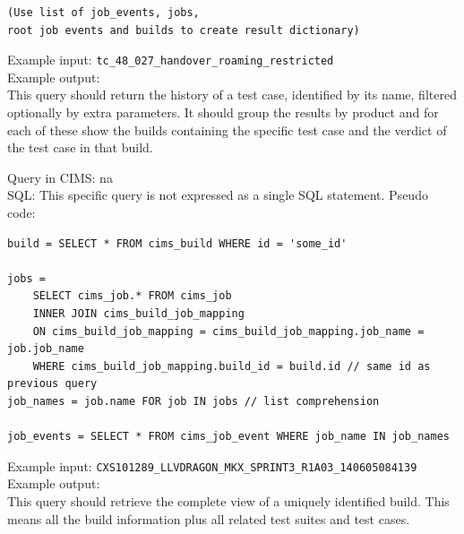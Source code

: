 {\begin{verbatim}
(Use list of job_events, jobs, 
root job events and builds to create result dictionary)

\end{verbatim}
Example input: {\tt tc\_48\_027\_handover\_roaming\_restricted } \\
Example output: \\
This query should return the history of a test case, identified by its name, filtered optionally by extra parameters. It should group the results by product and for each of these show the builds containing the specific test case and the verdict of the test case in that build.



\label{q:getallbuilddata}
Query in CIMS: na \\
SQL: This specific query is not expressed as a single SQL statement. Pseudo code:
\begin{verbatim}
build = SELECT * FROM cims_build WHERE id = 'some_id'

jobs = 
    SELECT cims_job.* FROM cims_job
    INNER JOIN cims_build_job_mapping
    ON cims_build_job_mapping = cims_build_job_mapping.job_name = job.job_name
    WHERE cims_build_job_mapping.build_id = build.id // same id as previous query
job_names = job.name FOR job IN jobs // list comprehension

job_events = SELECT * FROM cims_job_event WHERE job_name IN job_names
\end{verbatim}
Example input: {\tt CXS101289\_LLVDRAGON\_MKX\_SPRINT3\_R1A03\_140605084139 } \\
Example output: \\
This query should retrieve the complete view of a uniquely identified build. This means all the build information plus all related test suites and test cases.

}
